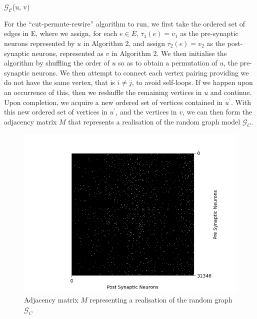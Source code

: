 \begin{algorithm}[H]
\DontPrintSemicolon
\SetAlgoLined
{}

{}
\caption{$\mathcal{G_{C}}$(u, v)}
\end{algorithm}

For the ``cut-permute-rewire'' \cite{WattsStrogatz1998} algorithm to run, we first take the ordered set of edges in E, where we assign, for each $e \in E$, $\tau_1(e) = v_1$ as the pre-synaptic neurons represented by $u$ in Algorithm 2, and assign $\tau_2(e) = v_2$ as the post-synaptic neurons, represented as $v$ in Algorithm 2. We then initialise the algorithm by shuffling the order of $u$ so as to obtain a permutation of $u$, the pre-synaptic neurons. We then attempt to connect each vertex pairing providing we do not have the same vertex, that is $i \neq j$, to avoid self-loops. If we happen upon an occurrence of this, then we reshuffle the remaining vertices in $u$ and continue. Upon completion, we acquire a new ordered set of vertices contained in $u^\prime$. With this new ordered set of vertices in $u^\prime$, and the vertices in $v$, we can then form the adjacency matrix $M$ that represents a realisation of the random graph model $\mathcal{G}_{C}$.

\begin{figure}[H]
\begin{center}
\captionsetup{justification=centering}
\includegraphics[width=12cm]{configuration/matrix_configuration.png}
\caption{Adjacency matrix $M$ representing a realisation of the random graph $\mathcal{G}_{C}$}
\end{center}
\end{figure}
